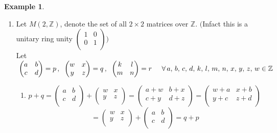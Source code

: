 \documentclass[11pt,a4paper]{article}
\theoremstyle{definition}
\newtheorem{exa}[thm]{Example}
\begin{document}
\begin{exa}
\begin{enumerate}
\item Let $M(2,\mathbb{Z})$, denote the set of all $2\times 2$ matrices over $\mathbb{Z}$. $\Big($Infact this is a unitary ring unity $\begin{pmatrix}
1 & 0\\
0 & 1\\
\end{pmatrix}\Big)$\\

Let $\hspace{0.1cm}\begin{pmatrix}
a & b\\
c & d\\
\end{pmatrix}  = p\, , \hspace{0.2cm} \begin{pmatrix}
w & x\\
y & z\\
\end{pmatrix} = q\, , \hspace{0.2cm} \begin{pmatrix}
k & l\\
m & n\\
\end{pmatrix} = r\hspace{0.5cm} \forall\, a, \, b, \, c, \, d, \, k, \, l, \, m,\, n, \, x, \, y, \, z,\, w\in \mathbb{Z}$\\


\begin{enumerate}
      \item[(i)] $p + q = \begin{pmatrix}
      a & b\\
      c & d\\
      \end{pmatrix} + \begin{pmatrix}
      w & x\\
      y & z\\
      \end{pmatrix} = \begin{pmatrix}
      a + w & b + x\\
      c + y & d + z\\
      \end{pmatrix} = \begin{pmatrix}
      w + a & x + b\\
      y + c & z + d\\
      \end{pmatrix}$\\ $$ = \begin{pmatrix}
      w & x\\
      y & z\\
      \end{pmatrix} + \begin{pmatrix}
      a & b\\
      c & d\\
      \end{pmatrix} = q + p$$\\
      

\end{enumerate}
\end{enumerate}
\end{exa}
\end{document}

